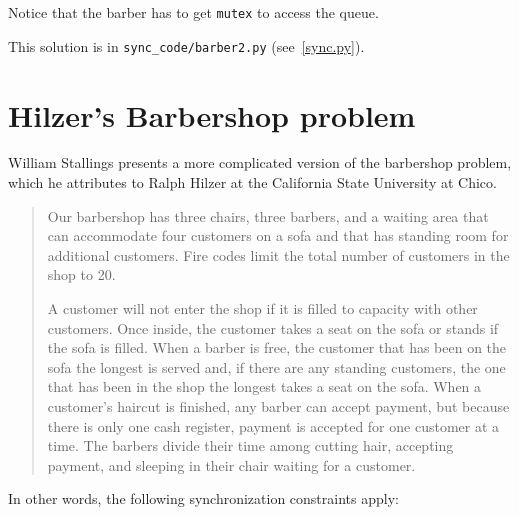 \documentclass{book}
\newcommand{\clearemptydoublepage}{\newpage\cleardoublepage}
\begin{document}
Notice that the barber has to get {\tt mutex} to access the
queue.

This solution is in \verb"sync_code/barber2.py" (see~\ref{sync.py}).


\clearemptydoublepage
\section {Hilzer's Barbershop problem}

William Stallings \cite{stallings} presents a more complicated version
of the barbershop problem, which he attributes to Ralph Hilzer at the
California State University at Chico.

\begin{quotation}
Our barbershop has three chairs, three barbers, and a waiting
area that can accommodate four customers on a sofa and that has
standing room for additional customers.  Fire codes limit the
total number of customers in the shop to 20.

A customer will not enter the shop if it is filled to capacity with
other customers.  Once inside, the customer takes a seat on the sofa
or stands if the sofa is filled.  When a barber is free, the customer
that has been on the sofa the longest is served and, if there are any
standing customers, the one that has been in the shop the longest
takes a seat on the sofa.  When a customer's haircut is finished, any
barber can accept payment, but because there is only one cash
register, payment is accepted for one customer at a time.  The barbers
divide their time among cutting hair, accepting payment, and sleeping
in their chair waiting for a customer.
\end{quotation}


In other words, the following synchronization constraints apply:
\end{document}

